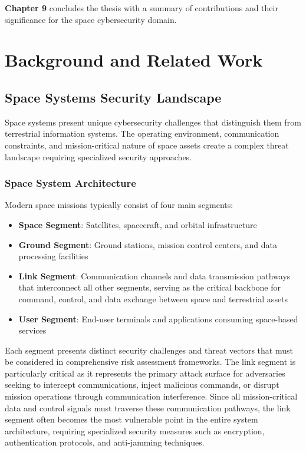 \documentclass[binding=0.6cm]{sapthesis}
\begin{document}
\textbf{Chapter 9} concludes the thesis with a summary of contributions and their significance for the space cybersecurity domain.

\chapter{Background and Related Work}
\label{ch:background}

\section{Space Systems Security Landscape}

Space systems present unique cybersecurity challenges that distinguish them from terrestrial information systems. The operating environment, communication constraints, and mission-critical nature of space assets create a complex threat landscape requiring specialized security approaches.

\subsection{Space System Architecture}

Modern space missions typically consist of four main segments:

\begin{itemize}
    \item \textbf{Space Segment}: Satellites, spacecraft, and orbital infrastructure
    \item \textbf{Ground Segment}: Ground stations, mission control centers, and data processing facilities
    \item \textbf{Link Segment}: Communication channels and data transmission pathways that interconnect all other segments, serving as the critical backbone for command, control, and data exchange between space and terrestrial assets
    \item \textbf{User Segment}: End-user terminals and applications consuming space-based services
\end{itemize}

Each segment presents distinct security challenges and threat vectors that must be considered in comprehensive risk assessment frameworks. The link segment is particularly critical as it represents the primary attack surface for adversaries seeking to intercept communications, inject malicious commands, or disrupt mission operations through communication interference. Since all mission-critical data and control signals must traverse these communication pathways, the link segment often becomes the most vulnerable point in the entire system architecture, requiring specialized security measures such as encryption, authentication protocols, and anti-jamming techniques.
\end{document}
